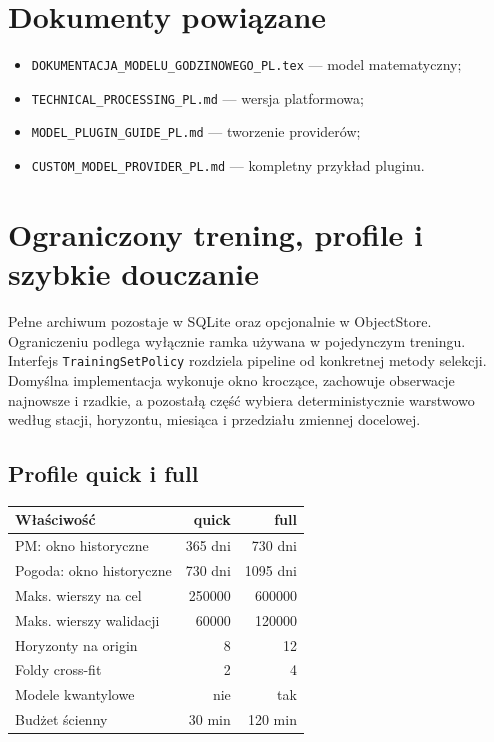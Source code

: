 \documentclass[11pt,a4paper,oneside]{article}
\begin{document}
\section{Dokumenty powiązane}

\begin{itemize}[nosep]
  \item \texttt{DOKUMENTACJA\_MODELU\_GODZINOWEGO\_PL.tex} --- model
        matematyczny;
  \item \texttt{TECHNICAL\_PROCESSING\_PL.md} --- wersja platformowa;
  \item \texttt{MODEL\_PLUGIN\_GUIDE\_PL.md} --- tworzenie providerów;
  \item \texttt{CUSTOM\_MODEL\_PROVIDER\_PL.md} --- kompletny przykład pluginu.
\end{itemize}



\section{Ograniczony trening, profile i szybkie douczanie}

Pełne archiwum pozostaje w SQLite oraz opcjonalnie w ObjectStore. Ograniczeniu
podlega wyłącznie ramka używana w pojedynczym treningu. Interfejs
\texttt{TrainingSetPolicy} rozdziela pipeline od konkretnej metody selekcji.
Domyślna implementacja wykonuje okno kroczące, zachowuje obserwacje najnowsze i
rzadkie, a pozostałą część wybiera deterministycznie warstwowo według stacji,
horyzontu, miesiąca i przedziału zmiennej docelowej.

\subsection{Profile quick i full}

\begin{center}
\begin{tabular}{lrr}
\toprule
Właściwość & quick & full\\
\midrule
PM: okno historyczne & 365 dni & 730 dni\\
Pogoda: okno historyczne & 730 dni & 1095 dni\\
Maks. wierszy na cel & 250000 & 600000\\
Maks. wierszy walidacji & 60000 & 120000\\
Horyzonty na origin & 8 & 12\\
Foldy cross-fit & 2 & 4\\
Modele kwantylowe & nie & tak\\
Budżet ścienny & 30 min & 120 min\\
\bottomrule
\end{tabular}
\end{center}
\end{document}
